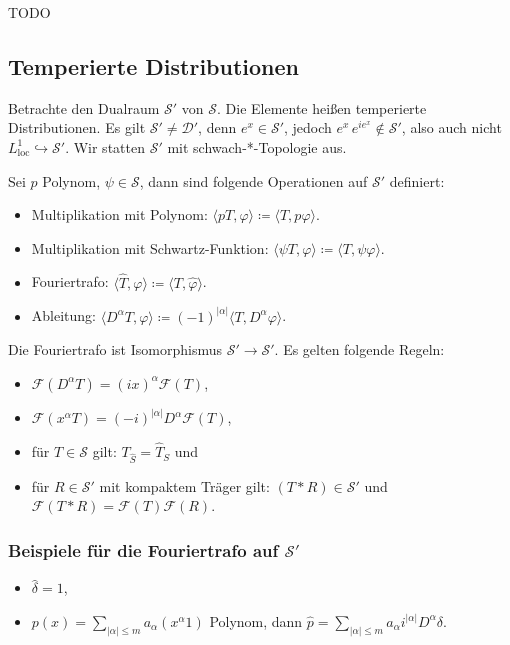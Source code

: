 \documentclass[11pt,a4paper]{scrartcl}
\newcommand{\D}{\mathcal{D}}
\newcommand{\Sc}{\mathcal{S}}
\newcommand{\F}{\mathcal{F}}
\theoremstyle{plain}
\theoremstyle{definition}
\theoremstyle{remark}
\DeclareMathOperator{\loc}{loc}
\begin{document}
TODO

\subsection{Temperierte Distributionen}

Betrachte den Dualraum $\Sc'$ von $\Sc$. Die Elemente heißen temperierte Distributionen. Es gilt $\Sc'\neq \D'$, denn $e^x\in \Sc'$, jedoch $e^x\, e^{ie^x} \not\in \Sc'$, also auch nicht $L^1_{\loc} \hookrightarrow \Sc'$. Wir statten $\Sc'$ mit schwach-*-Topologie aus.

Sei $p$ Polynom, $\psi\in \Sc$, dann sind folgende Operationen auf $\Sc'$ definiert:

\begin{itemize}
    \item Multiplikation mit Polynom: $\langle pT, \varphi \rangle \coloneqq \langle T, p\varphi \rangle$.
    \item Multiplikation mit Schwartz-Funktion: $\langle \psi T, \varphi \rangle \coloneqq \langle T, \psi\varphi \rangle$.
    \item Fouriertrafo: $\langle \hat T, \varphi \rangle \coloneqq \langle T, \hat\varphi \rangle$.
    \item Ableitung: $\langle D^\alpha T, \varphi \rangle \coloneqq (-1)^{|\alpha|} \langle T, D^\alpha \varphi \rangle$.
\end{itemize}

Die Fouriertrafo ist Isomorphismus $\Sc'\to\Sc'$. Es gelten folgende Regeln:

\begin{itemize}
    \item $\F(D^\alpha T) = (ix)^\alpha \F(T)$,
    \item $\F(x^\alpha T) = (-i)^{|\alpha|} D^\alpha \F(T)$,
    \item für $T\in \Sc$ gilt: $T_{\hat S} = \widehat T_S$ und
    \item für $R\in \Sc'$ mit kompaktem Träger gilt: $(T*R)\in \Sc'$ und $\F(T*R)=\F(T)\F(R)$.
\end{itemize}

\subsubsection{Beispiele für die Fouriertrafo auf $\Sc'$}

\begin{itemize}
    \item $\hat\delta = 1$,
    \item $p(x)=\sum_{|\alpha| \leq m} a_\alpha (x^\alpha 1)$ Polynom, dann $\hat p = \sum_{|\alpha| \leq m} a_\alpha i^{|\alpha|} D^\alpha \delta$.
\end{itemize}
\end{document}
